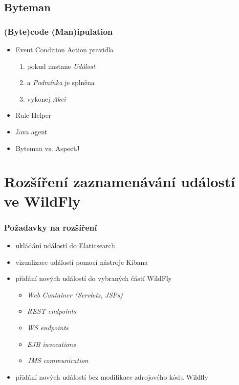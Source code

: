 \documentclass{beamer}
\begin{document}
\subsection{Byteman}
\begin{frame}
	\frametitle{(\textbf{Byte})code (\textbf{Man})ipulation}
\begin{itemize}
	\item Event Condition Action pravidla
	\begin{enumerate}
		\item pokud nastane \textit{Událost}
		\item a \textit{Podmínka} je splněna
		\item vykonej \textit{Akci}
	\end{enumerate}
	\item Rule Helper
	\item Java agent
	\item Byteman vs. AspectJ
\end{itemize}
\end{frame}

\section{Rozšíření zaznamenávání událostí ve WildFly}

\begin{frame}
	\frametitle{Požadavky na rozšíření}
	
	\begin{itemize}
		\item ukládání událostí do Elaticsearch
		\item vizualizace událostí pomocí nástroje Kibana
		\item přidání nových událostí do vybraných částí WildFly
		\begin{itemize}
			\item \textit{Web Container (Servlets, JSPs)}
			\item \textit{REST endpoints}
			\item \textit{WS endpoints}
			\item \textit{EJB invocations}
			\item \textit{JMS communication}
		\end{itemize}
		\item přidání nových událostí bez modifikace zdrojového kódu Wildfly
	\end{itemize}
\end{frame}
\end{document}
